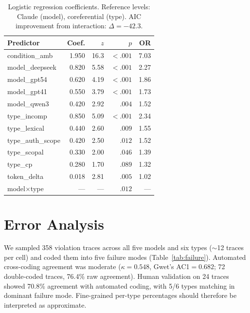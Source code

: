 \documentclass[11pt,twocolumn]{article}
\begin{document}
\begin{table}[t]
\centering
\small
\begin{tabular}{@{}lrrrr@{}}
\toprule
\textbf{Predictor} & \textbf{Coef.} & \textbf{$z$} & \textbf{$p$} & \textbf{OR} \\
\midrule
condition\_amb & 1.950 & 16.3 & ${<}.001$ & 7.03 \\
model\_deepseek & 0.820 & 5.58 & ${<}.001$ & 2.27 \\
model\_gpt54 & 0.620 & 4.19 & ${<}.001$ & 1.86 \\
model\_gpt41 & 0.550 & 3.79 & ${<}.001$ & 1.73 \\
model\_qwen3 & 0.420 & 2.92 & $.004$ & 1.52 \\
type\_incomp & 0.850 & 5.09 & ${<}.001$ & 2.34 \\
type\_lexical & 0.440 & 2.60 & $.009$ & 1.55 \\
type\_auth\_scope & 0.420 & 2.50 & $.012$ & 1.52 \\
type\_scopal & 0.330 & 2.00 & $.046$ & 1.39 \\
type\_cp & 0.280 & 1.70 & $.089$ & 1.32 \\
token\_delta & 0.018 & 2.81 & $.005$ & 1.02 \\
model$\times$type & --- & --- & $.012$ & --- \\
\bottomrule
\end{tabular}
\caption{Logistic regression coefficients. Reference levels: Claude (model), coreferential (type). AIC improvement from interaction: $\Delta=-42.3$.}
\label{tab:logistic}
\end{table}

\section{Error Analysis}
\label{sec:error}

We sampled 358 violation traces across all five models and six types ($\sim$12 traces per cell) and coded them into five failure modes (Table~\ref{tab:failure}).
Automated cross-coding agreement was moderate ($\kappa=0.548$, Gwet's AC1$=0.682$; 72 double-coded traces, 76.4\% raw agreement).
Human validation on 24 traces showed 70.8\% agreement with automated coding, with 5/6 types matching in dominant failure mode.
Fine-grained per-type percentages should therefore be interpreted as approximate.
\end{document}
